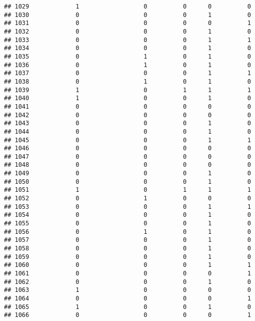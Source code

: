 \documentclass[
]{article}
\begin{document}
\begin{verbatim}
## 1029             1                  0          0      0          0
## 1030             0                  0          0      1          0
## 1031             0                  0          0      0          1
## 1032             0                  0          0      1          0
## 1033             0                  0          0      1          1
## 1034             0                  0          0      1          0
## 1035             0                  1          0      1          0
## 1036             0                  1          0      1          0
## 1037             0                  0          0      1          1
## 1038             0                  1          0      1          0
## 1039             1                  0          1      1          1
## 1040             1                  0          0      1          0
## 1041             0                  0          0      0          0
## 1042             0                  0          0      0          0
## 1043             0                  0          0      1          0
## 1044             0                  0          0      1          0
## 1045             0                  0          0      1          1
## 1046             0                  0          0      0          0
## 1047             0                  0          0      0          0
## 1048             0                  0          0      0          0
## 1049             0                  0          0      1          0
## 1050             0                  0          0      1          0
## 1051             1                  0          1      1          1
## 1052             0                  1          0      0          0
## 1053             0                  0          0      1          1
## 1054             0                  0          0      1          0
## 1055             0                  0          0      1          0
## 1056             0                  1          0      1          0
## 1057             0                  0          0      1          0
## 1058             0                  0          0      1          0
## 1059             0                  0          0      1          0
## 1060             0                  0          0      1          1
## 1061             0                  0          0      0          1
## 1062             0                  0          0      1          0
## 1063             1                  0          0      0          0
## 1064             0                  0          0      0          1
## 1065             1                  0          0      1          0
## 1066             0                  0          0      0          1

\end{verbatim}
\end{document}
